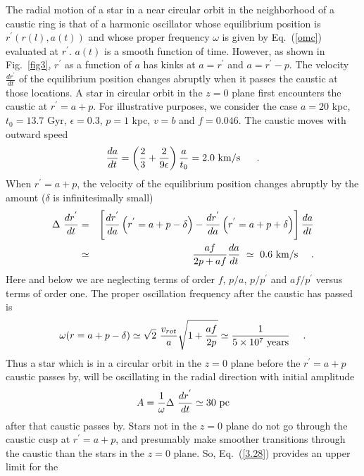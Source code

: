\documentclass[aps,prd,preprint,tightenlines,floatfix,showpacs,groupedaddress]{revtex4}
\begin{document}
{The radial motion of a star in a near circular orbit in the 
neighborhood of a caustic ring is that of a harmonic oscillator 
whose equilibrium position is $r^{'}\left(r(l),a(t)\right)$ and 
whose proper frequency $\omega$ is given by Eq.~(\ref{omc}) 
evaluated at $r^{'}$.  $a(t)$ is a smooth function of time. 
However, as shown in Fig.~\ref{fig3}, $r^{'}$ as a function 
of $a$ has kinks at $a=r^{'}$ and $a = r^{'} - p$.  The 
velocity $\frac{dr^{'}}{dt}$ of the equilibrium position 
changes abruptly when it passes the caustic at those locations.
A star in circular orbit in the $z=0$ plane first encounters 
the caustic at $r^{'} = a+p$.  For illustrative purposes, we 
consider the case $a = 20$ kpc, $t_0 = 13.7$ Gyr, $\epsilon = 0.3$, 
$p = 1$ kpc, $v=b$ and $f = 0.046$. The caustic moves with outward 
speed 
\begin{equation}
\frac{da}{dt} = 
\left(\frac{2}{3} + \frac{2}{9\epsilon}\right ) \frac{a}{t_0} 
= 2.0~{\rm km/s}~~~~\ . 
\end{equation}
When $r^\prime = a+p$, the velocity of the equilibrium position 
changes abruptly by the amount ($\delta$ is infinitesimally small)
\begin{eqnarray}
\Delta~\frac{dr^{'}}{dt} 
&=& \left[ \frac{dr^{'}}{da}\left(r^{'} = a + p - \delta \right) 
- \frac{dr^{'}}{da}\left( r^{'} = 
a + p + \delta \right) \right] \frac{da}{dt} \nonumber \\
&\simeq& \frac{af}{2p + af} \frac{da}{dt}~\simeq~0.6~{\rm km/s}~~~\ .
\end{eqnarray}
Here and below we are neglecting terms of order $f$, $p/a$, 
$p/p^\prime$ and $af/p^\prime$ versus terms of order one.  
The proper oscillation frequency after the caustic has passed is
\begin{equation}
\omega(r = a + p - \delta) \simeq 
\sqrt{2}~\frac{v_{rot}}{a} \sqrt{ 1 + \frac{af}{2p}} 
\simeq \frac{1}{5 \times 10^7~\rm{years}}~~~\ .
\end{equation}
Thus a star which is in a circular orbit in the $z=0$ plane before 
the $r^{'} = a+p$ caustic passes by, will be oscillating in the 
radial direction with initial amplitude
\begin{equation}
A = \frac{1}{\omega} \Delta~\frac{dr^{'}}{dt} \simeq 30~{\rm pc} 
\label{3.28}
\end{equation}
after that caustic passes by.  Stars not in the $z=0$ plane do not 
go through the caustic cusp at $r^{'}=a+p$, and presumably make
smoother transitions through the caustic than the stars in the 
$z=0$ plane. So, Eq.~(\ref{3.28}) provides an upper limit for the 
}
\end{document}
